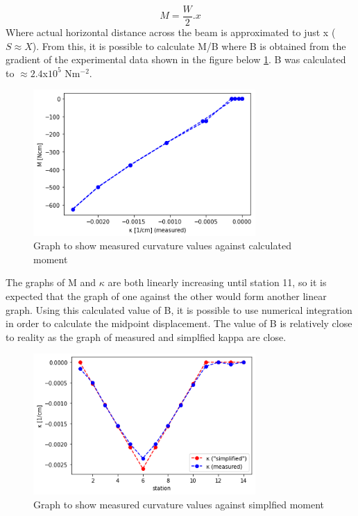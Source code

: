 \documentclass[12pt]{article}
\begin{document}
        \begin{equation}
            M = \frac{W}{2}.x
        \end{equation}
        Where actual horizontal distance across the beam is approximated to just x ($S \approx X$). From this, it is possible to calculate M/B where B is obtained from the gradient
        of the experimental data shown in the figure below \ref{moment_kappa}. B was calculated to $\approx 2.4$x$10^{5}$ Nm$^{-2}$.
        \begin{figure}[H]
            \centering
            \captionsetup{labelfont=bf}
            \includegraphics[width=20pc]{moment_kappa.png}
            \caption{Graph to show measured curvature values against calculated moment}\label{moment_kappa}
        \end{figure}
        The graphs of M and $\kappa$ are both linearly increasing until station 11, so it is expected that the graph of one against the other would form another linear
        graph. Using this calculated value of B, it is possible to use numerical integration in order to calculate the midpoint displacement. The value of B is relatively 
        close to reality as the graph of measured and simplfied kappa are close.
        \begin{figure}[H]
            \centering
            \captionsetup{labelfont=bf}
            \includegraphics[width=20pc]{kappa_station_simplified.png}
            \caption{Graph to show measured curvature values against simplfied moment}\label{kappa_station_simplified}
        \end{figure}
\end{document}
